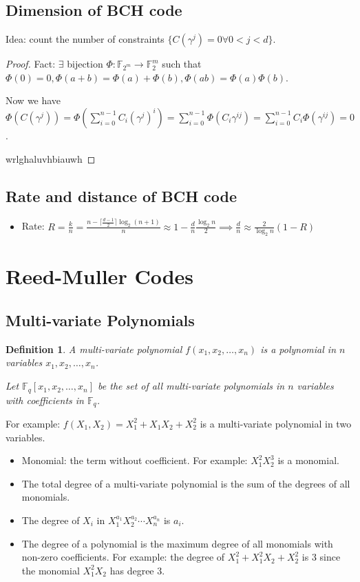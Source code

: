 \documentclass[letterpaper,12pt]{article}
\newtheorem{definition}{Definition}
\begin{document}
\subsection{Dimension of BCH code}
Idea: count the number of constraints $\{C(\gamma^j)=0 \forall 0<j <d \}$.

\begin{proof}
    Fact: $\exists$ bijection $\Phi: \mathbb{F}_{2^m} \to \mathbb{F}_{2}^m$ such that $\Phi(0) = 0, \Phi(a+b) = \Phi(a)+\Phi(b), \Phi(ab) = \Phi(a)\Phi(b)$.

    Now we have $\Phi(C(\gamma^j))=\Phi (\sum_{i=0}^{n-1} C_i(\gamma^j)^i) = \sum_{i=0}^{n-1}\Phi( C_i\gamma^{ij}) = \sum_{i=0}^{n-1}C_i\Phi( \gamma^{ij})=0$.


    wrlghaluvhbiauwh
\end{proof}

\subsection{Rate and distance of BCH code}
\begin{itemize}
    \item Rate: $R=\frac{k}{n}= \frac{n-\lceil \frac{d-1}{2} \rceil \log_2(n+1)}{n}\approx 1-\frac{d}{n}\frac{\log_2 n}{2}\implies \frac{d}{n}\approx \frac{2}{\log_2 n}(1-R)$
\end{itemize}

\section{Reed-Muller Codes}
\subsection{Multi-variate Polynomials}
\begin{definition}
    A multi-variate polynomial $f(x_1,x_2,\ldots,x_n)$ is a polynomial in $n$ variables $x_1,x_2,\ldots,x_n$.

    Let $\mathbb{F}_q[x_1,x_2,\ldots,x_n]$ be the set of all multi-variate polynomials in $n$ variables with coefficients in $\mathbb{F}_q$.
\end{definition}
For example: $f(X_1, X_2)= X_1^2+X_1X_2+X_2^2$ is a multi-variate polynomial in two variables.

\begin{itemize}
    \item Monomial: the term without coefficient. For example: $X_1^2X_2^3$ is a monomial.
    \item The total degree of a multi-variate polynomial is the sum of the degrees of all monomials.
    \item The degree of $X_i$ in $X_1^{a_1}X_2^{a_2}\cdots X_n^{a_n}$ is $a_i$.
    \item The degree of a polynomial is the maximum degree of all monomials with non-zero coefficients. For example: the degree of $X_1^2+X_1^2 X_2+X_2^2$ is 3 since the monomial $X_1^2X_2$ has degree 3.
\end{itemize}
\end{document}
